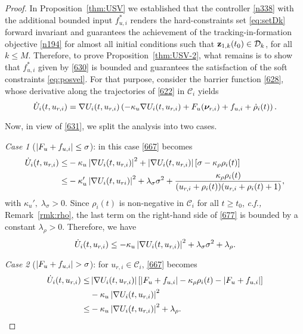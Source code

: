 \begin{proof}
	In Proposition~\ref{thm:USV} we established that the controller \eqref{n338} with the additional bounded input $f_{u, i}^*$	renders the hard-constraints set \eqref{eq:setDk} forward invariant and guarantees the achievement of the tracking-in-formation objective \eqref{n194} for almost all initial conditions such that $\mathbf{z}_{1, k}(t_0)\in\mathcal{D}_k$, for all $k\leq M$.
	Therefore, to prove Proposition~\ref{thm:USV-2}, what remains is to show that $f_{u, i}^*$ given by \eqref{630} is bounded and guarantees the satisfaction of the soft constraints \eqref{eq:posvel}.	
	For that purpose, consider the barrier function \eqref{628}, whose derivative along the trajectories of \eqref{622} in $\mathcal{C}_i$ yields 
	\begin{equation}\label{667}
		\dot{U}_{i}(t,u_{r, i}) = \nabla U_i(t,u_{r, i})\left(-\kappa_u\nabla U_i(t,u_{r, i}) + F_{u}(\bm{\nu}_{r, i}) + f_{u, i} + \dot{\rho}_i(t)\right).
	\end{equation}
	
	Now, in view of \eqref{631}, we split the analysis into two cases.
	
	\noindent \emph{Case 1} ($\left|F_{u}+f_{u, i}\right|\leq \sigma$): in this case \eqref{667} becomes
	\begin{equation}\label{677}\begin{aligned}
	\dot{U}_{i}(t,u_{r, i})\leq&-\kappa_u\left|\nabla U_i(t,u_{r, i})\right|^2+\left|\nabla U_i(t,u_{r, i})\right|\left[\sigma - \kappa_\rho\rho_i(t)\right]\\
	\leq& -\kappa_u'\left|\nabla U_i(t,u_{ri})\right|^2+\lambda_\sigma\sigma^2+\frac{\kappa_\rho\rho_i(t)}{(u_{r, i} + \rho_i(t))(u_{r, i} + \rho_i(t) +1)},
	\end{aligned}\end{equation}
	with $\kappa_u',\;\lambda_\sigma>0$.
	Since $\rho_i(t)$ is non-negative in $\mathcal{C}_i$ for all $t\geq t_0$, \emph{c.f.,} Remark~\ref{rmk:rho}, the last term on the right-hand side of \eqref{677} is bounded by a constant $\lambda_\rho>0$. Therefore, we have 
	\begin{equation}\label{681}
	\dot{U}_{i}(t,u_{r, i})\leq-\kappa_u\left|\nabla U_i(t,u_{r, i})\right|^2+\lambda_\sigma\sigma^2+\lambda_\rho.
	\end{equation}
	
	\noindent \emph{Case 2} ($\abs{F_{u}+f_{u, i}}> \sigma$): for $u_{r, i}\in\mathcal{C}_i$, \eqref{667} becomes
	\begin{equation}\label{687}\begin{aligned}
	\dot{U}_{i}(t,u_{r, i})\leq&\left|\nabla U_i(t,u_{r, i})\right|\left[\left|F_{u}+f_{u, i}\right| - \kappa_\rho\rho_i(t) - \left|F_{u}+f_{u, i}\right|\right]\\
	& -\kappa_u\left|\nabla U_i(t,u_{r, i})\right|^2 \\
	\leq& -\kappa_u\left|\nabla U_i(t,u_{r, i})\right|^2+\lambda_\rho.
	\end{aligned}\end{equation}
	

\end{proof}
